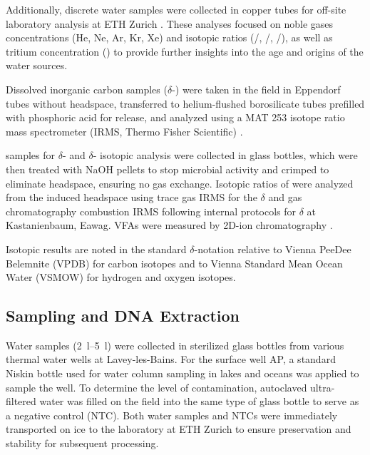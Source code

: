 Additionally, discrete water samples were collected in copper tubes for off-site laboratory analysis at ETH Zurich \citep{beyerle2000mass}.
These analyses focused on noble gases concentrations (He, Ne, Ar, Kr, Xe) and isotopic ratios (/, /, /), as well as tritium concentration () to provide further insights into the age and origins of the water sources.

Dissolved inorganic carbon samples ($\delta$-) were taken in the field in Eppendorf tubes without headspace, transferred to helium-flushed borosilicate tubes prefilled with phosphoric acid for  release, and analyzed using a MAT 253 isotope ratio mass spectrometer (IRMS, Thermo Fisher Scientific) \citep{vandijk2018oxygen}.

 samples for $\delta$- and $\delta$- isotopic analysis were collected in glass bottles, which were then treated with NaOH pellets to stop microbial activity and crimped to eliminate headspace, ensuring no gas exchange. 
Isotopic ratios of  were analyzed from the induced headspace using trace gas IRMS for the $\delta$ \citep{thomas2019lateral} and gas chromatography combustion IRMS following internal protocols for $\delta$ at Kastanienbaum, Eawag. 
VFAs were measured by 2D-ion chromatography \citep{glombitza2014vfas}.

Isotopic results are noted in the standard $\delta$-notation relative to Vienna PeeDee Belemnite (VPDB) for carbon isotopes and to Vienna Standard Mean Ocean Water (VSMOW) for hydrogen and oxygen isotopes.


\subsection{Sampling and DNA Extraction}

Water samples (\SIrange{2}{5}{\litre}) were collected in sterilized glass bottles from various thermal water wells at Lavey-les-Bains.
For the surface well AP, a standard Niskin bottle used for water column sampling in lakes and oceans was applied to sample the well. 
To determine the level of contamination, autoclaved ultra-filtered water was filled on the field into the same type of glass bottle to serve as a negative control (NTC).
Both water samples and NTCs were immediately transported on ice to the laboratory at ETH Zurich to ensure preservation and stability for subsequent processing.

